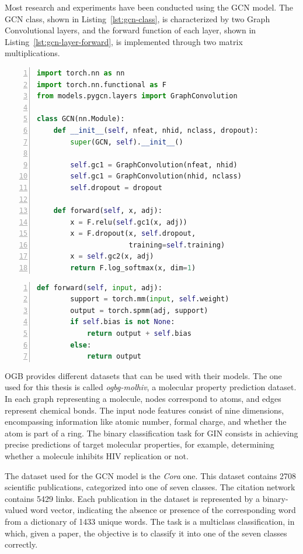Most research and experiments have been conducted using the GCN model.
The GCN class, shown in Listing~\ref{lst:gcn-class}, is characterized by two Graph Convolutional layers, and the forward function of each layer, shown in Listing~\ref{lst:gcn-layer-forward}, is implemented through two matrix multiplications.

\begin{lstlisting}[language=Python,label={lst:gcn-class}, numbers=left, xleftmargin=2em, caption=Class of GCN model, float]
import torch.nn as nn
import torch.nn.functional as F
from models.pygcn.layers import GraphConvolution

class GCN(nn.Module):
    def __init__(self, nfeat, nhid, nclass, dropout):
        super(GCN, self).__init__()

        self.gc1 = GraphConvolution(nfeat, nhid)
        self.gc1 = GraphConvolution(nhid, nclass)
        self.dropout = dropout

    def forward(self, x, adj):
        x = F.relu(self.gc1(x, adj))
        x = F.dropout(x, self.dropout,
                      training=self.training)
        x = self.gc2(x, adj)
        return F.log_softmax(x, dim=1)
\end{lstlisting}


\begin{lstlisting}[language=Python,label={lst:gcn-layer-forward}, numbers=left, xleftmargin=2em, caption=Forward function of GCN layer, float]
    def forward(self, input, adj):
        support = torch.mm(input, self.weight)
        output = torch.spmm(adj, support)
        if self.bias is not None:
            return output + self.bias
        else:
            return output
\end{lstlisting}

OGB provides different datasets that can be used with their models.
The one used for this thesis is called \textit{ogbg-molhiv}, a molecular property prediction dataset.
In each graph representing a molecule, nodes correspond to atoms, and edges represent chemical bonds.
The input node features consist of nine dimensions, encompassing information like atomic number, formal charge, and whether the atom is part of a ring.
The binary classification task for GIN consists in achieving precise predictions of target molecular properties, for example, determining whether a molecule inhibits HIV replication or not.

The dataset used for the GCN model is the \textit{Cora} one.
This dataset contains 2708 scientific publications, categorized into one of seven classes.
The citation network contains 5429 links.
Each publication in the dataset is represented by a binary-valued word vector, indicating the absence or presence of the corresponding word from a dictionary of 1433 unique words.
The task is a multiclass classification, in which, given a paper, the objective is to classify it into one of the seven classes correctly.

